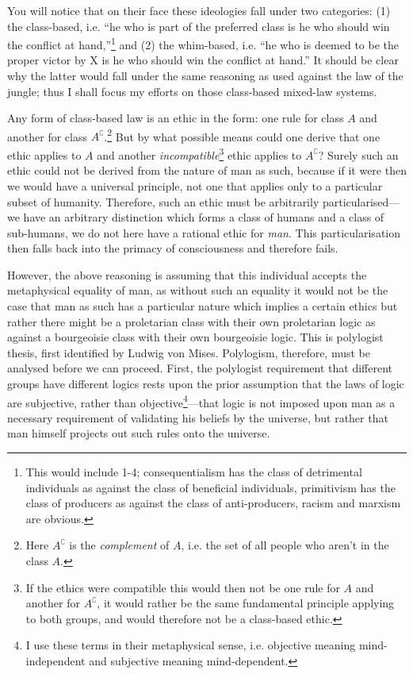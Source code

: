 \documentclass[11pt]{article}
\begin{document}
You will notice that on their face these ideologies fall under two categories: (1) the class-based, i.e. ``he who is part of the preferred class is he who should win the conflict at hand,''\footnote{This would include 1-4; consequentialism has the class of detrimental individuals as against the class of beneficial individuals, primitivism has the class of producers as against the class of anti-producers, racism and marxism are obvious.} and (2) the whim-based, i.e. ``he who is deemed to be the proper victor by X is he who should win the conflict at hand.'' It should be clear why the latter would fall under the same reasoning as used against the law of the jungle; thus I shall focus my efforts on those class-based mixed-law systems.

Any form of class-based law is an ethic in the form: one rule for class \(A\) and another for class \(A^\complement\).\footnote{Here \(A^\complement\) is the \emph{complement} of \(A\), i.e. the set of all people who aren't in the class \(A\).} But by what possible means could one derive that one ethic applies to \(A\) and another \emph{incompatible}\footnote{If the ethics were compatible this would then not be one rule for \(A\) and another for \(A^\complement\), it would rather be the same fundamental principle applying to both groups, and would therefore not be a class-based ethic.} ethic applies to \(A^\complement\)? Surely such an ethic could not be derived from the nature of man as such, because if it were then we would have a universal principle, not one that applies only to a particular subset of humanity. Therefore, such an ethic must be arbitrarily particularised---we have an arbitrary distinction which forms a class of humans and a class of sub-humans, we do not here have a rational ethic for \emph{man}. This particularisation then falls back into the primacy of consciousness and therefore fails.

However, the above reasoning is assuming that this individual accepts the metaphysical equality of man, as without such an equality it would not be the case that man as such has a particular nature which implies a certain ethics but rather there might be a proletarian class with their own proletarian logic as against a bourgeoisie class with their own bourgeoisie logic. This is polylogist thesis, first identified by Ludwig von Mises. Polylogism, therefore, must be analysed before we can proceed. First, the polylogist requirement that different groups have different logics rests upon the prior assumption that the laws of logic are subjective, rather than objective\footnote{I use these terms in their metaphysical sense, i.e. objective meaning mind-independent and subjective meaning mind-dependent.}---that logic is not imposed upon man as a necessary requirement of validating his beliefs by the universe, but rather that man himself projects out such rules onto the universe.
\end{document}
